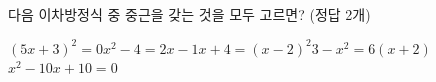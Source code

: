 다음 이차방정식 중 중근을 갖는 것을 모두 고르면? (정답 2개)
\begin{choicesv}{$(5x+3)^2=0$}{$x^2-4=2x-1$}{$x+4=(x-2)^2$}{$3-x^2=6(x+2)$}{$x^2-10x+10=0$}\end{choicesv}

